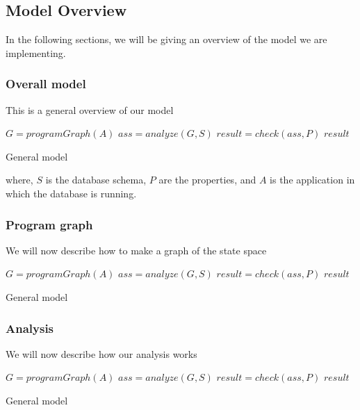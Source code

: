 \subsection{Model Overview}\label{subsec:model-overview}

In the following sections, we will be giving an overview of the model we are implementing.

\subsubsection{Overall model}\label{subsubsec:overall-model}

This is a general overview of our model

\begin{algorithm}[htb!]
    \begin{codebox}
        \li $G = programGraph(A)$
        \li $ass = analyze(G,S)$
        \li $result = check(ass,P)$
        \li \Return $result$
    \end{codebox}
    \caption{General model}
    \label{alg:model}
\end{algorithm}
\noindent where, $S$ is the database schema, $P$ are the properties, and $A$ is the application in which the database is running.

\subsubsection{Program graph}\label{subsubsec:program-graph}

We will now describe how to make a graph of the state space

\begin{algorithm}[htb!]
    \begin{codebox}
        \li $G = programGraph(A)$
        \li $ass = analyze(G,S)$
        \li $result = check(ass,P)$
        \li \Return $result$
    \end{codebox}
    \caption{General model}
    \label{alg:program-graph}
\end{algorithm}

\subsubsection{Analysis}\label{subsubsec:analysis}

We will now describe how our analysis works

\begin{algorithm}[htb!]
    \begin{codebox}
        \li $G = programGraph(A)$
        \li $ass = analyze(G,S)$
        \li $result = check(ass,P)$
        \li \Return $result$
    \end{codebox}
    \caption{General model}
    \label{alg:analysis}

\end{algorithm}

